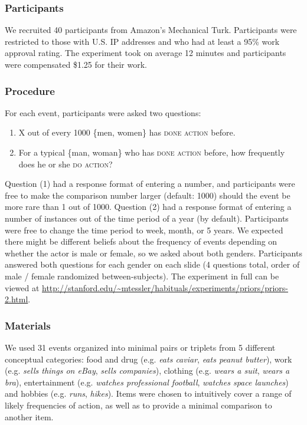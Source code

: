 \documentclass[10pt,letterpaper]{article}
\begin{document}
\subsubsection{Participants}
We recruited 40 participants from Amazon's Mechanical Turk.
Participants were restricted to those with U.S. IP addresses and who had at least a 95\% work approval rating.
The experiment took on average 12 minutes and participants were compensated \$1.25 for their work.

\subsubsection{Procedure}

For each event, participants were asked two questions:
\begin{enumerate}
\item X out of every 1000 \{men, women\} has \textsc{done action} before.
\item For a typical \{man, woman\} who has \textsc{done action} before, how frequently does he or she \textsc{do action}? 
\end{enumerate}

Question (1) had a response format of entering a number, and participants were free to make the comparison number larger (default: 1000) should the event be more rare than 1 out of 1000.
Question (2) had a response format of entering a number of instances out of the time period of a year (by default). Participants were free to change the time period to week, month, or 5 years.
We expected there might be different beliefs about the frequency of events depending on whether the actor is male or female, so we asked about both genders. Participants answered both questions for each gender on each slide (4 questions total, order of male / female randomized between-subjects).
The experiment in full can be viewed at \url{http://stanford.edu/~mtessler/habituals/experiments/priors/priors-2.html}.

\subsubsection{Materials}

We used 31 events organized into minimal pairs or triplets from 5 different conceptual categories: food and drug (e.g. \emph{eats caviar}, \emph{eats peanut butter}), work (e.g. \emph{sells things on eBay}, \emph{sells companies}), clothing (e.g. \emph{wears a suit}, \emph{wears a bra}), entertainment (e.g. \emph{watches professional football}, \emph{watches space launches}) and hobbies (e.g. \emph{runs}, \emph{hikes}). 
Items were chosen to intuitively cover a range of likely frequencies of action, as well as to provide a minimal comparison to another item.
\end{document}
